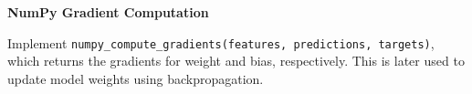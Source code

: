 \item {} \textbf{NumPy Gradient Computation}

Implement \texttt{numpy\_compute\_gradients(features, predictions, targets)}, which returns the gradients for weight and bias, respectively. This is later used to update model weights using backpropagation. 